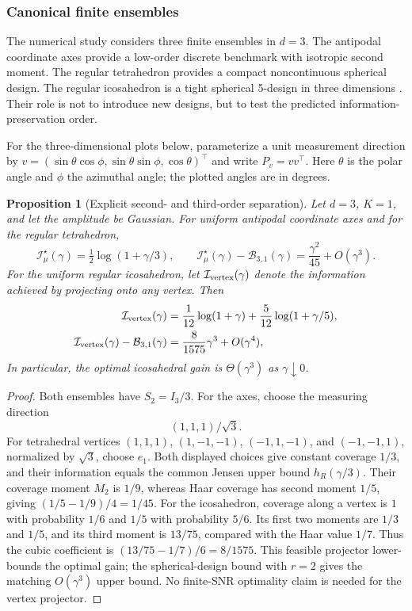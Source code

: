 \documentclass[lettersize,onecolumn]{IEEEtran}
\newtheorem{proposition}{Proposition}
\theoremstyle{remark}
\theoremstyle{definition}
\newcommand{\I}{\mathcal I}
\newcommand{\Bbase}{\mathcal B}
\begin{document}
\subsubsection{Canonical finite ensembles}
The numerical study considers three finite ensembles in $d=3$. The antipodal coordinate axes provide a low-order discrete benchmark with isotropic second moment. The regular tetrahedron provides a compact noncontinuous spherical design. The regular icosahedron is a tight spherical 5-design in three dimensions \cite{reznick1995}. Their role is not to introduce new designs, but to test the predicted information-preservation order.

For the three-dimensional plots below, parameterize a unit measurement
direction by $v=(\sin\theta\cos\phi,\sin\theta\sin\phi,\cos\theta)^\top$
and write $P_v=vv^\top$. Here $\theta$ is the polar angle and $\phi$ the
azimuthal angle; the plotted angles are in degrees.

\begin{proposition}[Explicit second- and third-order separation]\label{prop:examples}
Let $d=3$, $K=1$, and let the amplitude be Gaussian. For uniform antipodal coordinate axes and for the regular tetrahedron,
\begin{equation}
\I_\mu^\star(\gamma)=\tfrac12\log(1+\gamma/3),\qquad
\I_\mu^\star(\gamma)-\Bbase_{3,1}(\gamma)=\frac{\gamma^2}{45}+O(\gamma^3).
\end{equation}
For the uniform regular icosahedron, let $\I_{\rm vertex}(\gamma)$ denote the
information achieved by projecting onto any vertex. Then
\begin{equation}
\begin{split}
\I_{\rm vertex}(\gamma)&=\frac1{12}\log(1+\gamma)+\frac5{12}\log(1+\gamma/5),\\
\I_{\rm vertex}(\gamma)-\Bbase_{3,1}(\gamma)&=\frac{8}{1575}\gamma^3+O(\gamma^4),
\end{split}
\label{eq:ico_witness}
\end{equation}
In particular, the optimal icosahedral gain is $\Theta(\gamma^3)$ as $\gamma\downarrow0$.
\end{proposition}
\begin{proof}
Both ensembles have $S_2=I_3/3$. For the axes, choose the measuring direction
\begin{equation*}
(1,1,1)/\sqrt3.
\end{equation*}
For tetrahedral vertices $(1,1,1)$, $(1,-1,-1)$, $(-1,1,-1)$, and $(-1,-1,1)$, normalized by $\sqrt3$, choose $e_1$. Both displayed choices give constant coverage $1/3$, and their information equals the common Jensen upper bound $h_R(\gamma/3)$. Their coverage moment $M_2$ is $1/9$, whereas Haar coverage has second moment $1/5$, giving $(1/5-1/9)/4=1/45$.
For the icosahedron, coverage along a vertex is $1$ with probability $1/6$ and $1/5$ with probability $5/6$. Its first two moments are $1/3$ and $1/5$, and its third moment is $13/75$, compared with the Haar value $1/7$. Thus the cubic coefficient is $(13/75-1/7)/6=8/1575$. This feasible projector lower-bounds the optimal gain; the spherical-design bound with $r=2$ gives the matching $O(\gamma^3)$ upper bound. No finite-SNR optimality claim is needed for the vertex projector.
\end{proof}
\end{document}
